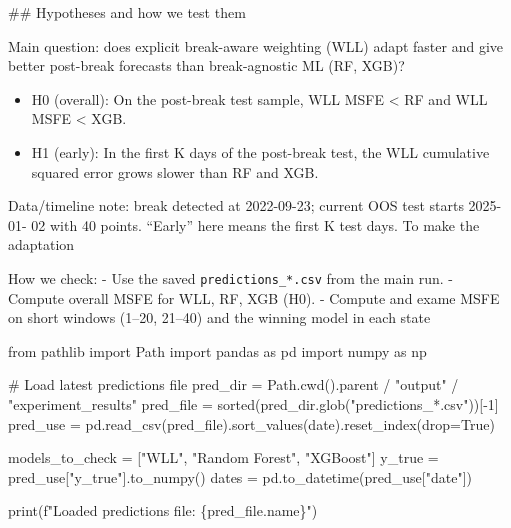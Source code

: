 \documentclass[
  letterpaper,
  DIV=11,
  numbers=noendperiod]{scrartcl}
\newenvironment{Shaded}{\begin{snugshade}}{\end{snugshade}}
\newcommand{\BuiltInTok}[1]{\textcolor[rgb]{0.00,0.23,0.31}{#1}}
\newcommand{\CommentTok}[1]{\textcolor[rgb]{0.37,0.37,0.37}{#1}}
\newcommand{\DecValTok}[1]{\textcolor[rgb]{0.68,0.00,0.00}{#1}}
\newcommand{\ImportTok}[1]{\textcolor[rgb]{0.00,0.46,0.62}{#1}}
\newcommand{\NormalTok}[1]{\textcolor[rgb]{0.00,0.23,0.31}{#1}}
\newcommand{\OperatorTok}[1]{\textcolor[rgb]{0.37,0.37,0.37}{#1}}
\newcommand{\SpecialCharTok}[1]{\textcolor[rgb]{0.37,0.37,0.37}{#1}}
\newcommand{\SpecialStringTok}[1]{\textcolor[rgb]{0.13,0.47,0.30}{#1}}
\newcommand{\StringTok}[1]{\textcolor[rgb]{0.13,0.47,0.30}{#1}}
\newcommand{\VariableTok}[1]{\textcolor[rgb]{0.07,0.07,0.07}{#1}}
\providecommand{\tightlist}{%
  \setlength{\itemsep}{0pt}\setlength{\parskip}{0pt}}
\begin{document}
\#\# Hypotheses and how we test them

Main question: does explicit break-aware weighting (WLL) adapt faster
and give better post-break forecasts than break-agnostic ML (RF, XGB)?

\begin{itemize}
\tightlist
\item
  H0 (overall): On the post-break test sample, WLL MSFE \textless{} RF
  and WLL MSFE \textless{} XGB.
\item
  H1 (early): In the first K days of the post-break test, the WLL
  cumulative squared error grows slower than RF and XGB.
\end{itemize}

Data/timeline note: break detected at 2022-09-23; current OOS test
starts 2025-01- 02 with 40 points. ``Early'' here means the first K test
days. To make the adaptation

How we check: - Use the saved \texttt{predictions\_*.csv} from the main
run. - Compute overall MSFE for WLL, RF, XGB (H0). - Compute and exame
MSFE on short windows (1--20, 21--40) and the winning model in each
state

\begin{Shaded}
\begin{Highlighting}[]
\ImportTok{from}\NormalTok{ pathlib }\ImportTok{import}\NormalTok{ Path}
\ImportTok{import}\NormalTok{ pandas }\ImportTok{as}\NormalTok{ pd}
\ImportTok{import}\NormalTok{ numpy }\ImportTok{as}\NormalTok{ np}

\CommentTok{\# Load latest predictions file}
\NormalTok{pred\_dir }\OperatorTok{=}\NormalTok{ Path.cwd().parent }\OperatorTok{/} \StringTok{"output"} \OperatorTok{/} \StringTok{"experiment\_results"}
\NormalTok{pred\_file }\OperatorTok{=} \BuiltInTok{sorted}\NormalTok{(pred\_dir.glob(}\StringTok{"predictions\_*.csv"}\NormalTok{))[}\OperatorTok{{-}}\DecValTok{1}\NormalTok{]}
\NormalTok{pred\_use }\OperatorTok{=}\NormalTok{ pd.read\_csv(pred\_file).sort\_values(}\StringTok{\textquotesingle{}date\textquotesingle{}}\NormalTok{).reset\_index(drop}\OperatorTok{=}\VariableTok{True}\NormalTok{)}

\NormalTok{models\_to\_check }\OperatorTok{=}\NormalTok{ [}\StringTok{"WLL"}\NormalTok{, }\StringTok{"Random Forest"}\NormalTok{, }\StringTok{"XGBoost"}\NormalTok{]}
\NormalTok{y\_true }\OperatorTok{=}\NormalTok{ pred\_use[}\StringTok{"y\_true"}\NormalTok{].to\_numpy()}
\NormalTok{dates }\OperatorTok{=}\NormalTok{ pd.to\_datetime(pred\_use[}\StringTok{"date"}\NormalTok{])}

\BuiltInTok{print}\NormalTok{(}\SpecialStringTok{f"Loaded predictions file: }\SpecialCharTok{\{}\NormalTok{pred\_file}\SpecialCharTok{.}\NormalTok{name}\SpecialCharTok{\}}\SpecialStringTok{"}\NormalTok{)}
\end{Highlighting}
\end{Shaded}
\end{document}
